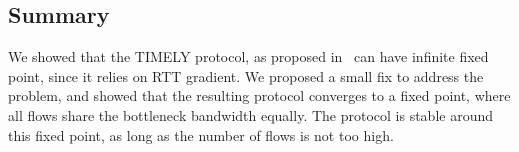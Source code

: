 \subsection{Summary}
We showed that the TIMELY protocol, as proposed in~\cite{timely} can have
infinite fixed point, since it relies on RTT gradient. We proposed a small fix
to address the problem, and showed that the resulting protocol converges to a
fixed point, where all flows share the bottleneck bandwidth equally. The
protocol is stable around this fixed point, as long as the number of flows is
not too high.
